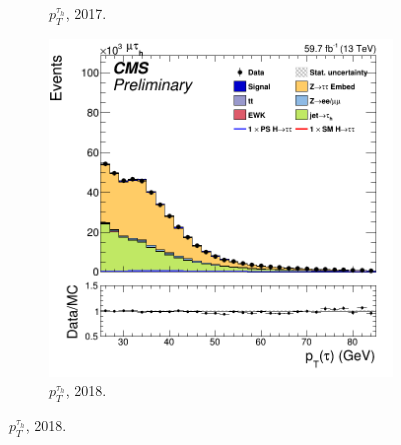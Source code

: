 \begin{figure}
\begin{subfigure}[b]{0.33\linewidth}
    \caption{$p^{\tau_h}_T$, 2017.} 
    \vspace{0.5ex}
  \end{subfigure} 
    \begin{subfigure}[b]{0.33\linewidth}
    \centering
    \includegraphics[width=\linewidth]{Chapitre7/Images/CtrlPlots/2018/TaupT.png} 
    \caption{$p^{\tau_h}_T$, 2018.} 
    \vspace{0.5ex}
  \end{subfigure}
  

\end{figure}
